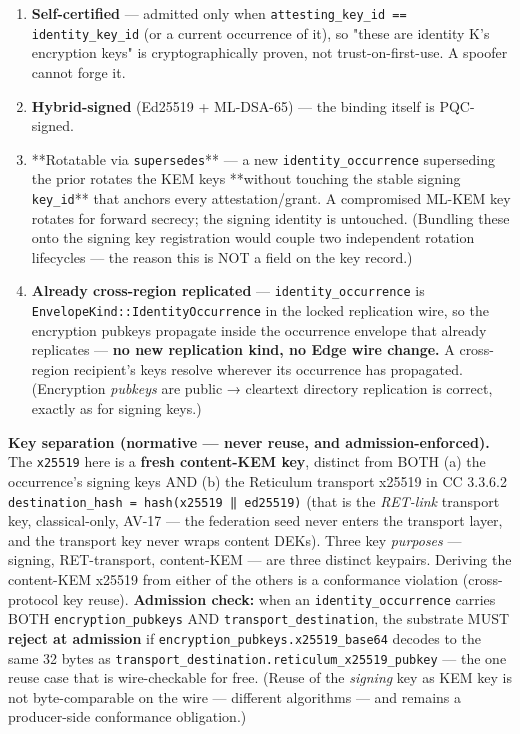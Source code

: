 \documentclass[11pt]{article}
\begin{document}
\begin{enumerate}\setlength\itemsep{0pt}
\item \textbf{Self-certified} — admitted only when \texttt{attesting\_key\_id == identity\_key\_id} (or a current occurrence of it), so "these are identity K's encryption keys" is cryptographically proven, not trust-on-first-use. A spoofer cannot forge it.
\item \textbf{Hybrid-signed} (Ed25519 + ML-DSA-65) — the binding itself is PQC-signed.
\item **Rotatable via \texttt{supersedes}** — a new \texttt{identity\_occurrence} superseding the prior rotates the KEM keys **without touching the stable signing \texttt{key\_id}** that anchors every attestation/grant. A compromised ML-KEM key rotates for forward secrecy; the signing identity is untouched. (Bundling these onto the signing key registration would couple two independent rotation lifecycles — the reason this is NOT a field on the key record.)
\item \textbf{Already cross-region replicated} — \texttt{identity\_occurrence} is \texttt{EnvelopeKind::IdentityOccurrence} in the locked replication wire, so the encryption pubkeys propagate inside the occurrence envelope that already replicates — \textbf{no new replication kind, no Edge wire change.} A cross-region recipient's keys resolve wherever its occurrence has propagated. (Encryption \textit{pubkeys} are public → cleartext directory replication is correct, exactly as for signing keys.)
\end{enumerate}


\textbf{Key separation (normative — never reuse, and admission-enforced).} The \texttt{x25519} here is a \textbf{fresh content-KEM key}, distinct from BOTH (a) the occurrence's signing keys AND (b) the Reticulum transport x25519 in CC 3.3.6.2 \texttt{destination\_hash = hash(x25519 ‖ ed25519)} (that is the \textit{RET-link} transport key, classical-only, AV-17 — the federation seed never enters the transport layer, and the transport key never wraps content DEKs). Three key \textit{purposes} — signing, RET-transport, content-KEM — are three distinct keypairs. Deriving the content-KEM x25519 from either of the others is a conformance violation (cross-protocol key reuse). \textbf{Admission check:} when an \texttt{identity\_occurrence} carries BOTH \texttt{encryption\_pubkeys} AND \texttt{transport\_destination}, the substrate MUST \textbf{reject at admission} if \texttt{encryption\_pubkeys.x25519\_base64} decodes to the same 32 bytes as \texttt{transport\_destination.reticulum\_x25519\_pubkey} — the one reuse case that is wire-checkable for free. (Reuse of the \textit{signing} key as KEM key is not byte-comparable on the wire — different algorithms — and remains a producer-side conformance obligation.)
\end{document}
